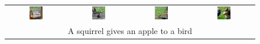 \begin{figure}[ht!]
\begin{tabular}{cccc}
        \includegraphics[width=0.24\textwidth]{figures/scaling_comparison/apple_0.jpg} &
        \includegraphics[width=0.24\textwidth]{figures/scaling_comparison/apple_1.jpg} &
        \includegraphics[width=0.24\textwidth]{figures/scaling_comparison/apple_2.jpg} &
        \includegraphics[width=0.24\textwidth]{figures/scaling_comparison/apple_3.jpg}\vspace{1mm} \\
        \multicolumn{4}{c}{\small A squirrel gives an apple to a bird}\vspace{3mm}\\


\end{tabular}
\end{figure}
